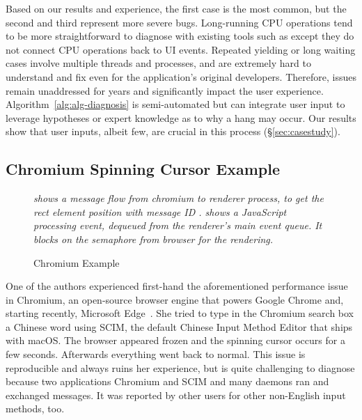 \noindent
Based on our results and experience, the first case is the most common, but the
second and third represent more severe bugs. Long-running CPU operations tend to
be more straightforward to diagnose with existing tools such as \spindump except
they do not connect CPU operations back to UI events. Repeated yielding or
long waiting cases involve multiple threads and processes, and are extremely
hard to understand and fix even for the application's original developers.
Therefore, issues remain unaddressed for years and significantly impact the
user experience. Algorithm~\ref{alg:alg-diagnosis} is semi-automated but can
integrate user input to leverage hypotheses or expert knowledge
as to why a hang may occur. Our results show that user inputs, albeit few, are
crucial in this process (\S\ref{sec:casestudy}).

\subsection{Chromium Spinning Cursor Example}

\begin{figure}[tb]
	\footnotesize
    \centering
	
	\parbox{\columnwidth}{\caption{Chromium Example}
		\textit{ shows a message flow from chromium to renderer process, to get the
			rect element position with message ID . 
			shows a JavaScript processing event, dequeued from the renderer's main event
		queue. It blocks on the semaphore from browser for the rendering.}
    \label{fig:chromium-case-study}
	}
\end{figure}

One of the authors experienced first-hand the aforementioned performance issue
in Chromium, an open-source browser engine that powers Google Chrome and,
starting recently, Microsoft Edge~\cite{chromiumurl}. She tried to type in the
Chromium search box a Chinese word using SCIM, the default Chinese Input Method
Editor that ships with macOS. The browser appeared frozen and the spinning
cursor occurs for a few seconds. Afterwards everything went back to normal.
This issue is reproducible and always ruins her experience, but is quite
challenging to diagnose because two applications Chromium and SCIM and many
daemons ran and exchanged messages. It was reported by other users for
other non-English input methods, too.

